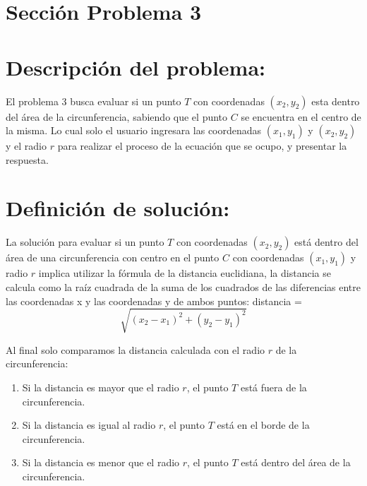 \documentclass{IEEEcsmag}
\begin{document}
\clearpage












\section{Sección Problema 3}

\section*{Descripción del problema:}
\begin{enumerate}
El problema 3 busca evaluar si un punto $T$ con coordenadas $(x_{2}, y_{2})$ esta dentro del área de la circunferencia, sabiendo que el punto $C$ se encuentra en el centro de la misma. Lo cual solo el usuario ingresara las coordenadas $(x_{1}, y_{1})$ y $(x_{2}, y_{2})$  y el radio $r$ para realizar el proceso de la  ecuación que se ocupo, y presentar la respuesta.
\end{enumerate}


\section*{Definición de solución:}
La solución para evaluar si un punto $T$ con coordenadas $(x_{2}, y_{2})$ está dentro del área de una circunferencia con centro en el punto $C$ con coordenadas $(x_{1}, y_{1})$ y radio $r$ implica utilizar la fórmula de la distancia euclidiana, la distancia se calcula como la raíz cuadrada de la suma de los cuadrados de las diferencias entre las coordenadas x y las coordenadas y de ambos puntos:
distancia = 
\begin{equation}
   \sqrt{ (x_2 - x_1)^2 + (y_2 - y_1)^2 }     
\end{equation}



Al final solo comparamos la distancia calculada con el radio $r$ de la circunferencia:
\begin{enumerate}
\item Si la distancia es mayor que el radio $r$, el punto $T$ está fuera de la circunferencia.
\item Si la distancia es igual al radio $r$, el punto $T$ está en el borde de la circunferencia.
\item Si la distancia es menor que el radio $r$, el punto $T$ está dentro del área de la circunferencia.    
\end{enumerate}
\end{document}
